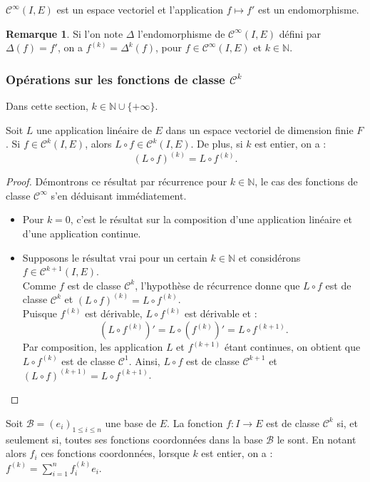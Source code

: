 \documentclass[french]{article}
\newcommand{\N}{\mathbb{N}}
\theoremstyle{plain}
\theoremstyle{definition}
\newtheorem*{rmq}{Remarque}
\theoremstyle{remark}
\begin{document}
\begin{cor}%
	$\mathcal{C}^\infty(I,E)$ est un espace vectoriel et l'application $f\mapsto f'$ est un endomorphisme.
\end{cor}

\begin{rmq}
	Si l'on note $\Delta$ l'endomorphisme de $\mathcal{C}^\infty(I,E)$ défini par $\Delta(f)=f'$, on a $f^{(k)}=\Delta^k(f)$, pour $f\in\mathcal{C}^\infty(I,E)$ et $k\in\N$.
\end{rmq}

\subsubsection*{Opérations sur les fonctions de classe $\mathcal{C}^k$}

Dans cette section, $k\in\N\cup\{+\infty\}$.

\begin{prop}%
	Soit $L$ une application linéaire de $E$ dans un espace vectoriel de dimension finie $F$. Si $f\in\mathcal{C}^k(I,E)$, alors $L\circ f\in\mathcal{C}^k(I,E)$. De plus, si $k$ est entier, on a :
	$$(L\circ f)^{(k)}=L\circ f^{(k)}.$$
\end{prop}
\begin{proof}
	Démontrons ce résultat par récurrence pour $k\in\N$, le cas des fonctions de classe $\mathcal{C}^\infty$ s'en déduisant immédiatement.
	\begin{itemize}
		\item Pour $k=0$, c'est le résultat sur la composition d'une application linéaire et d'une application continue.
		\item Supposons le résultat vrai pour un certain $k\in\N$ et considérons $f\in\mathcal{C}^{k+1}(I,E)$. \\
		Comme $f$ est de classe $\mathcal{C}^k$, l'hypothèse de récurrence donne que $L\circ f$ est de classe $\mathcal{C}^k$ et $(L\circ f)^{(k)}=L\circ f^{(k)}$. \\
		Puisque $f^{(k)}$ est dérivable, $L\circ f^{(k)}$ est dérivable et :
		$$(L\circ f^{(k)})'=L\circ (f^{(k)})'=L\circ f^{(k+1)}.$$
		Par composition, les application $L$ et $f^{(k+1)}$ étant continues, on obtient que $L\circ f^{(k)}$ est de classe $\mathcal{C}^1$. Ainsi, $L\circ f$ est de classe $\mathcal{C}^{k+1}$ et $(L\circ f)^{(k+1)}=L\circ f^{(k+1)}$.
	\end{itemize}
\end{proof}

\begin{cor}%
	Soit $\mathcal{B}=(e_i)_{1\leqslant i\leqslant n}$ une base de $E$. La fonction $f:I\to E$ est de classe $\mathcal{C}^k$ si, et seulement si, toutes ses fonctions coordonnées dans la base $\mathcal{B}$ le sont. En notant alors $f_i$ ces fonctions coordonnées, lorsque $k$ est entier, on a : $f^{(k)}=\displaystyle\sum_{i=1}^{n}f_i^{(k)}e_i$.
\end{cor}
\end{document}
